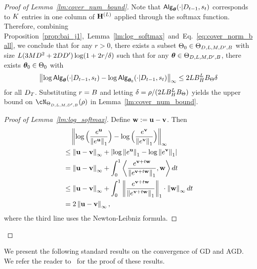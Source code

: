 \begin{proof}[Proof of Lemma~\ref{lm:cover_num_bound}]
Note that  ${\mathsf{Alg}}_{{{\boldsymbol \theta}}}(\cdot|{D}_{t-1},{s}_t)$ corresponds to ${K}$ entries in one column of ${{\mathbf H}}^{({L})}$ applied  through the softmax function. Therefore, combining Proposition~\ref{prop:bai_j1},~Lemma~\ref{lm:log_softmax}~and~Eq.~\eqref{eq:cover_norm_ball}, we conclude that for any $r>0$, there exists a subset ${\Theta}_0\in{\Theta}_{D, {L},{M},{D'},{B}}$ with size ${L}(3{M}{D}^2+2{D}{D'})\log(1+2r/\delta)$ such that for any ${{\boldsymbol \theta}}\in{\Theta}_{D, {L},{M},{D'},{B}}$, there exists ${{\boldsymbol \theta}}_0\in{\Theta}_0$ with
\begin{align*}
    \left\|{\log {\mathsf{Alg}}_{{{\boldsymbol \theta}}}(\cdot|{D}_{t-1},{s}_t)-\log {\mathsf{Alg}}_{{{\boldsymbol \theta}}_0}(\cdot|{D}_{t-1},{s}_t)}\right\|_\infty
     \leq 2{L}{B}_{H}^{L}{B}_\Theta \delta
\end{align*} for all ${D}_{T}$. Substituting $r={B}$ and letting $ \delta=\rho/( 2{L}{B}_{H}^{L}{B}_\Theta)$ yields the upper bound on $\cN_{\tfparspace_{D, \layer,\head,\hidden,\normb}}(\rho)$ in Lemma~\ref{lm:cover_num_bound}.


\begin{proof}[Proof of Lemma~\ref{lm:log_softmax}]
Define ${\mathbf w}:={\mathbf u}-{\mathbf v}$. Then
  \begin{align*}
    &\quad\left\|{\log \Big(\frac{e^{\mathbf u}}{\left\|{e^{\mathbf u}}\right\|_1}\Big)-\log \Big(\frac{e^{\mathbf v}}{\left\|{e^{\mathbf v}}\right\|_1}\Big)}\right\|_\infty\\
    &\leq
    \left\|{{\mathbf u}-{\mathbf v}}\right\|_\infty+|{\log \left\|{e^{\mathbf u}}\right\|_1-\log \left\|{e^{\mathbf v}}\right\|_1}|\\
    &= 
    \left\|{{\mathbf u}-{\mathbf v}}\right\|_\infty+\int_{0}^1 \left\langle\frac{e^{{\mathbf v}+t{\mathbf w}}}{\left\|{e^{{\mathbf v}+t{\mathbf w}}}\right\|_1},{\mathbf w}\right\rangle dt\\
     &\leq 
    \left\|{{\mathbf u}-{\mathbf v}}\right\|_\infty+\int_{0}^1 \left\|{\frac{e^{{\mathbf v}+t{\mathbf w}}}{\left\|{e^{{\mathbf v}+t{\mathbf w}}}\right\|_1}}\right\|_1\cdot\left\|{{\mathbf w}}\right\|_\infty dt\\
    &=2\left\|{{\mathbf u}-{\mathbf v}}\right\|_\infty,
    \end{align*} where the third line uses the Newton-Leibniz formula.
\end{proof}

\end{proof}


We present the following standard results on the convergence of GD and AGD. We refer the reader to~\cite{nesterov2003introductory} for the proof of these results. 

